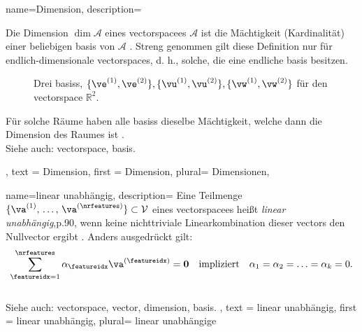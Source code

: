 {name={Dimension},
 description={
 Die Dimension \(\dim \mathcal{A}\) eines \gls{vectorspace}es \(\mathcal{A}\) ist die Mächtigkeit (Kardinalität) einer beliebigen \gls{basis} von \(\mathcal{A}\) \cite{Axler2025}. 
 Streng genommen gilt diese Definition nur für endlich-dimensionale \glspl{vectorspace}, d. h., solche, die eine endliche \gls{basis} besitzen. 
 \begin{figure}[H]
  \caption{Drei \glspl{basis}, \(\{\ve^{(1)},\ve^{(2)}\}, \{\vu^{(1)},\vu^{(2)}\}, \{\vw^{(1)},\vw^{(2)}\}\) für den \gls{vectorspace} \(\mathbb R^2\).}
 \end{figure}
 Für solche Räume haben alle \glspl{basis} dieselbe Mächtigkeit, welche dann die Dimension des Raumes ist \cite[Kap. 2]{Axler2025}.\\
 Siehe auch: \gls{vectorspace}, \gls{basis}.
 },
 text = {Dimension},
 first = {Dimension},
 plural= {Dimensionen},
}

{name={linear unabhängig},
 description={
 Eine Teilmenge $\{\va^{(1)}, \,\ldots, \,\va^{(\nrfeatures)}\} \subset \mathcal{V}$ 
 eines \gls{vectorspace}es heißt \emph{linear unabhängig}\cite{Thomas2013LineareAlgebra}{,p.90}, 
 wenn keine nichttriviale Linearkombination dieser \glspl{vector} 
 den Null\gls{vector} ergibt \cite{StrangLinAlg2016}. 
 Anders ausgedrückt gilt:
 \[
 \sum_{\featureidx=1}^{\nrfeatures} \alpha_{\featureidx} \va^{(\featureidx)} = \mathbf{0}	
 \quad \text{impliziert} \quad \alpha_{1} = \alpha_{2} = \ldots = \alpha_{k} = 0.
 \]
 \\[0.5em]
 Siehe auch: \gls{vectorspace}, \gls{vector}, \gls{dimension}, \gls{basis}.
 },
 text = {linear unabhängig},
 first = {linear unabhängig},
 plural= {linear unabhängige}
}


